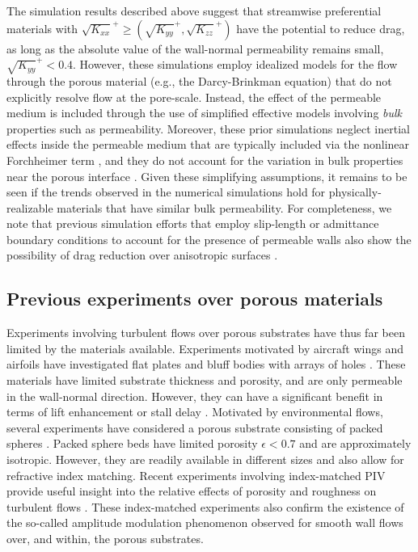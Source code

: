 \documentclass[letterpaper,11pt]{article}
\newcommand{\kpxx}{\sqrt{K_{xx}}^+}
\newcommand{\kpyy}{\sqrt{K_{yy}}^+}
\newcommand{\kpzz}{\sqrt{K_{zz}}^+}
\begin{document}
The simulation results described above suggest that streamwise preferential materials with $\kpxx \ge (\kpyy,\kpzz)$ have the potential to reduce drag, as long as the absolute value of the wall-normal permeability remains small, $\kpyy < 0.4$.  However, these simulations employ idealized models for the flow through the porous material (e.g., the Darcy-Brinkman equation) that do not explicitly resolve flow at the pore-scale.  Instead, the effect of the permeable medium is included through the use of simplified effective models involving \textit{bulk} properties such as permeability. Moreover, these prior simulations neglect inertial effects inside the permeable medium that are typically included via the nonlinear Forchheimer term \citep{whitaker1996forchheimer,breugem2006influence}, and they do not account for the variation in bulk properties near the porous interface \citep{lacis_Bagheri_2017}.  Given these simplifying assumptions, it remains to be seen if the trends observed in the numerical simulations hold for physically-realizable materials that have similar bulk permeability. For completeness, we note that previous simulation efforts that employ slip-length or admittance boundary conditions to account for the presence of permeable walls also show the possibility of drag reduction over anisotropic surfaces \citep{jimenez2001turbulent,hahn2002direct,busse_Sandham_2012}.

\subsection{Previous experiments over porous materials}
Experiments involving turbulent flows over porous substrates have thus far been limited by the materials available.  %
Experiments motivated by aircraft wings and airfoils have investigated flat plates and bluff bodies with arrays of holes \citep{kong1982turbulent, ruff1972turbulent}. These materials have limited substrate thickness and porosity, and are only permeable in the wall-normal direction.  However, they can have a significant benefit in terms of lift enhancement or stall delay \citep{hanna2019aerodynamic}.
Motivated by environmental flows, several experiments have considered a porous substrate consisting of packed spheres \citep[e.g.,][]{zagni1976channel,blois2020novel}. Packed sphere beds have limited porosity $\epsilon < 0.7$ and are approximately isotropic.  However, they are readily available in different sizes and also allow for refractive index matching. Recent experiments involving index-matched PIV provide useful insight into the relative effects of porosity and roughness on turbulent flows \citep{kim2019piv, kim2020experimental}.  These index-matched experiments also confirm the existence of the so-called amplitude modulation phenomenon observed for smooth wall flows \citep{marusic2010predictive} over, and within, the porous substrates. 
\end{document}
